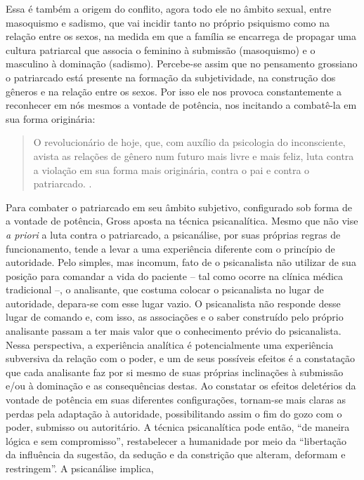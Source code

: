 Essa é também a origem do conflito, agora todo ele no âmbito sexual,
entre masoquismo e sadismo, que vai incidir tanto no próprio psiquismo
como na relação entre os sexos, na medida em que a família se encarrega
de propagar uma cultura patriarcal que associa o feminino à submissão
(masoquismo) e o masculino à dominação (sadismo). Percebe-se assim que
no pensamento grossiano o patriarcado está presente na formação da
subjetividade, na construção dos gêneros e na relação entre os sexos.
Por isso ele nos provoca constantemente a reconhecer em nós mesmos a
vontade de potência, nos incitando a combatê-la em sua forma originária:

\begin{quote}
O revolucionário de hoje, que, com auxílio da psicologia do
inconsciente, avista as relações de gênero num futuro mais livre e mais
feliz, luta contra a violação em sua forma mais originária, contra o pai
e contra o patriarcado. .
\end{quote}

Para combater o patriarcado em seu âmbito subjetivo, configurado sob
forma de a vontade de potência, Gross aposta na técnica psicanalítica.
Mesmo que não vise \emph{a priori} a luta contra o patriarcado, a
psicanálise, por suas próprias regras de funcionamento, tende a levar a
uma experiência diferente com o princípio de autoridade. Pelo simples,
mas incomum, fato de o psicanalista não utilizar de sua posição para
comandar a vida do paciente -- tal como ocorre na clínica médica
tradicional --, o analisante, que costuma colocar o psicanalista no
lugar de autoridade, depara-se com esse lugar vazio. O psicanalista não
responde desse lugar de comando e, com isso, as associações e o saber
construído pelo próprio analisante passam a ter mais valor que o
conhecimento prévio do psicanalista. Nessa perspectiva, a experiência
analítica é potencialmente uma experiência subversiva da relação com o
poder, e um de seus possíveis efeitos é a constatação que cada
analisante faz por si mesmo de suas próprias inclinações à submissão
e/ou à dominação e as consequências destas. Ao constatar os efeitos
deletérios da vontade de potência em suas diferentes configurações,
tornam-se mais claras as perdas pela adaptação à autoridade,
possibilitando assim o fim do gozo com o poder, submisso ou autoritário.
A técnica psicanalítica pode então, ``de maneira lógica e sem
compromisso'', restabelecer a humanidade por meio da ``libertação da
influência da sugestão, da sedução e da constrição que alteram, deformam
e restringem''. A psicanálise implica,

